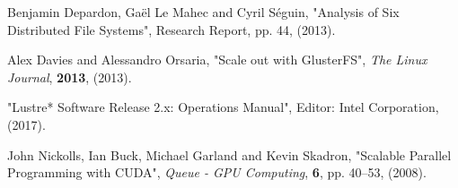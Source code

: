 \documentclass[twoside,a4paper,12pt,english]{inac17}
\begin{document}
\begin{thebibliography}{99}
 Benjamin Depardon, Ga\"{e}l Le Mahec and Cyril S\'{e}guin, "Analysis of Six Distributed File Systems", Research Report, pp. 44, (2013).
  
 Alex Davies and Alessandro Orsaria, "Scale out with GlusterFS", \textit{The Linux Journal}, \textbf{2013}, (2013).

   "Lustre* Software Release 2.x: Operations Manual", Editor: Intel Corporation, (2017).


 John Nickolls, Ian Buck, Michael Garland and Kevin Skadron, "Scalable Parallel Programming with CUDA", \textit{Queue - GPU Computing}, \textbf{6}, pp. 40--53, (2008).



  




\end{thebibliography}


%
%
\end{document}
